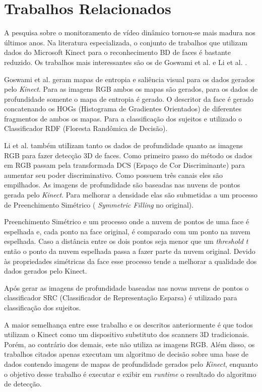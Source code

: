 \section{Trabalhos Relacionados}\label{sec:trabalhos-relacionados}

A pesquisa sobre o monitoramento de vídeo dinâmico tornou-se mais madura nos últimos anos. Na literatura especializada, o conjunto de trabalhos que utilizam dados do
Microsoft Kinect para o reconhecimento BD de faces é bastante reduzido. Os trabalhos mais interessantes são os de Goswami et al. \cite{goswami2013rgb} e Li et al. \cite{li2013using}.

Goswami et al. \cite{goswami2013rgb} geram mapas de entropia e saliência visual para os dados gerados pelo \textit{Kinect}. Para as imagens RGB ambos os mapas são gerados, para os dados de profundidade somente o mapa de entropia é gerado. O descritor da face é gerado concatenando os HOGs (Histograma de Gradientes Orientados) de diferentes fragmentos de ambos os mapas. Para a classificação dos sujeitos e utilizado o Classificador RDF (Floresta Randômica de Decisão).
 
Li et al. \cite{goswami2013rgb} também utiIizam tanto os dados de profundidade quanto as imagens RGB para fazer detecção 3D de faces. Como primeiro passo do método os dados em RGB passam pela transformada DCS (Espaço de Cor Discriminante) para aumentar seu poder discriminativo. Como possuem três canais eles são empilhados. As imagens de profundidade são baseadas nas nuvens de pontos gerada pelo  \textit{Kinect}. Para melhorar a densidade elas são submetidas a um processo de Preenchimento Simétrico ( \textit{Symmetric Filling} no original).
 
Preenchimento Simétrico e um processo onde a nuvem de pontos de uma face é espelhada e, cada ponto na face original, é comparado com um ponto na nuvem espelhada. Caso a distância entre os dois pontos seja menor que um  \textit{threshold t} então o ponto da nuvem espelhada passa a fazer parte da nuvem original. Devido às propriedades simétricas da face esse processo tende a melhorar a qualidade dos dados gerados pelo Kinect.
 
Após gerar as imagens de profundidade baseadas nas novas nuvens de pontos o classificador SRC (Classificador de Representação Esparsa) é utilizado para classificação dos sujeitos.
 
A maior semelhança entre esse trabalho e os descritos anteriormente é que todos utilizam o Kinect como um dispositivo substituto dos scanners 3D tradicionais. Porém, ao contrário dos demais, este não utiliza as imagens RGB. Além disso, os trabalhos citados apenas executam um algoritmo de decisão sobre uma base de dados contendo imagens de mapas de profundidade gerados pelo  \textit{Kinect}, enquanto o objetivo desse trabalho é executar e exibir em  \textit{runtime} o resultado do algoritmo de detecção.



